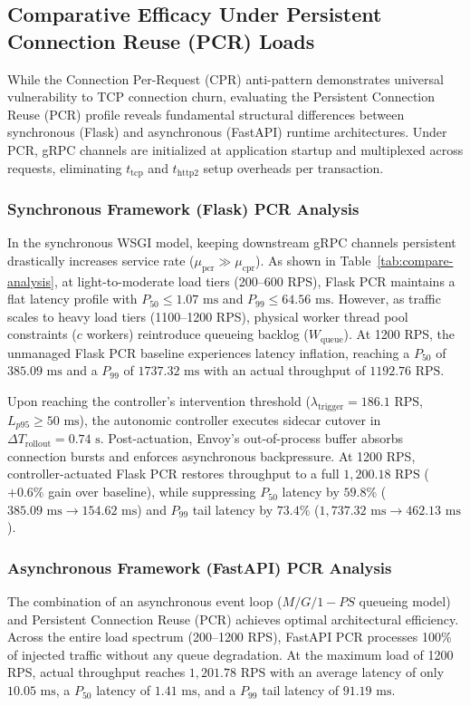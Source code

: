 \documentclass{ieeeaccess}
\begin{document}
\subsection{Comparative Efficacy Under Persistent Connection Reuse (PCR) Loads}
\label{sec5.3_pcr_comparison}

While the Connection Per-Request (CPR) anti-pattern demonstrates universal vulnerability to TCP connection churn, evaluating the Persistent Connection Reuse (PCR) profile reveals fundamental structural differences between synchronous (Flask) and asynchronous (FastAPI) runtime architectures. Under PCR, gRPC channels are initialized at application startup and multiplexed across requests, eliminating $t_{\text{tcp}}$ and $t_{\text{http2}}$ setup overheads per transaction.

\subsubsection{Synchronous Framework (Flask) PCR Analysis}
In the synchronous WSGI model, keeping downstream gRPC channels persistent drastically increases service rate ($\mu_{\text{pcr}} \gg \mu_{\text{cpr}}$). As shown in Table~\ref{tab:compare-analysis}, at light-to-moderate load tiers (200--600 RPS), Flask PCR maintains a flat latency profile with $P_{50} \le 1.07\text{ ms}$ and $P_{99} \le 64.56\text{ ms}$. However, as traffic scales to heavy load tiers (1100--1200 RPS), physical worker thread pool constraints ($c$ workers) reintroduce queueing backlog ($W_{\text{queue}}$). At 1200 RPS, the unmanaged Flask PCR baseline experiences latency inflation, reaching a $P_{50}$ of $385.09\text{ ms}$ and a $P_{99}$ of $1737.32\text{ ms}$ with an actual throughput of $1192.76\text{ RPS}$.

Upon reaching the controller's intervention threshold ($\lambda_{\text{trigger}} = 186.1\text{ RPS}$, $L_{p95} \ge 50\text{ ms}$), the autonomic controller executes sidecar cutover in $\Delta T_{\text{rollout}} = 0.74\text{ s}$. Post-actuation, Envoy's out-of-process buffer absorbs connection bursts and enforces asynchronous backpressure. At 1200 RPS, controller-actuated Flask PCR restores throughput to a full $1,200.18\text{ RPS}$ ($+0.6\%$ gain over baseline), while suppressing $P_{50}$ latency by $59.8\%$ ($385.09\text{ ms} \to 154.62\text{ ms}$) and $P_{99}$ tail latency by $73.4\%$ ($1,737.32\text{ ms} \to 462.13\text{ ms}$).

\subsubsection{Asynchronous Framework (FastAPI) PCR Analysis}
The combination of an asynchronous event loop ($M/G/1-PS$ queueing model) and Persistent Connection Reuse (PCR) achieves optimal architectural efficiency. Across the entire load spectrum (200--1200 RPS), FastAPI PCR processes 100\% of injected traffic without any queue degradation. At the maximum load of 1200 RPS, actual throughput reaches $1,201.78\text{ RPS}$ with an average latency of only $10.05\text{ ms}$, a $P_{50}$ latency of $1.41\text{ ms}$, and a $P_{99}$ tail latency of $91.19\text{ ms}$.
\end{document}

